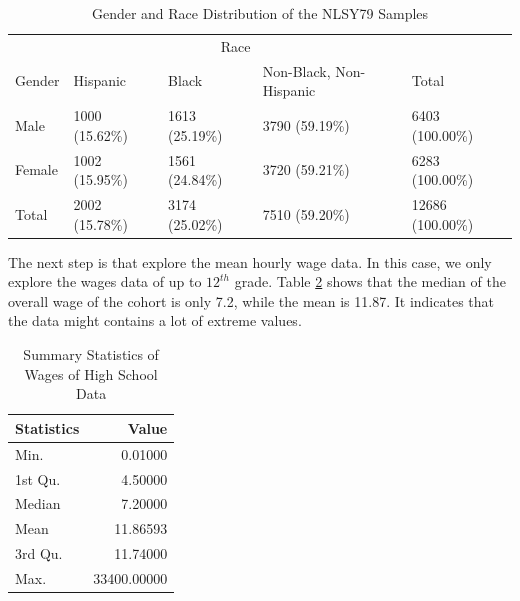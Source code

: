 \documentclass[12pt]{article}
\begin{document}
\begin{table}

\caption{\label{tab:gender-race-table}Gender and Race Distribution of the NLSY79 Samples}
\centering
\begin{tabular}[t]{l|l|l|l|l}
\hline
\multicolumn{1}{c|}{ } & \multicolumn{3}{c|}{Race} & \multicolumn{1}{c}{ } \\
\cline{2-4}
Gender & Hispanic & Black & Non-Black, Non-Hispanic & Total\\
\hline
Male & 1000 (15.62\%) & 1613 (25.19\%) & 3790 (59.19\%) & 6403 (100.00\%)\\
\hline
Female & 1002 (15.95\%) & 1561 (24.84\%) & 3720 (59.21\%) & 6283 (100.00\%)\\
\hline
Total & 2002 (15.78\%) & 3174 (25.02\%) & 7510 (59.20\%) & 12686 (100.00\%)\\
\hline
\end{tabular}
\end{table}

The next step is that explore the mean hourly wage data. In this case, we only explore the wages data of up to \(12^{th}\) grade. Table \ref{tab:summarytable} shows that the median of the overall wage of the cohort is only 7.2, while the mean is 11.87. It indicates that the data might contains a lot of extreme values.

\begin{table}

\caption{\label{tab:summarytable}Summary Statistics of Wages of High School Data}
\centering
\begin{tabular}[t]{l|r}
\hline
Statistics & Value\\
\hline
Min. & 0.01000\\
\hline
1st Qu. & 4.50000\\
\hline
Median & 7.20000\\
\hline
Mean & 11.86593\\
\hline
3rd Qu. & 11.74000\\
\hline
Max. & 33400.00000\\
\hline
\end{tabular}
\end{table}
\end{document}
